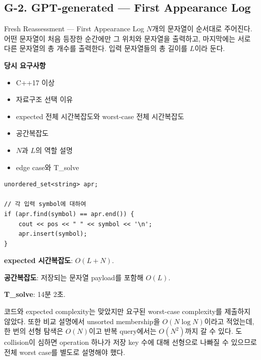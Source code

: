 \subsection{G-2. GPT-generated --- First Appearance Log}
\begin{problembox}{Fresh Reassessment --- First Appearance Log}
$N$개의 문자열이 순서대로 주어진다. 어떤 문자열이 처음 등장한 순간에만 그 위치와 문자열을 출력하고, 마지막에는 서로 다른 문자열의 총 개수를 출력한다. 입력 문자열들의 총 길이를 $L$이라 둔다.

\textbf{당시 요구사항}
\begin{itemize}
\item C++17 이상
\item 자료구조 선택 이유
\item expected 전체 시간복잡도와 worst-case 전체 시간복잡도
\item 공간복잡도
\item $N$과 $L$의 역할 설명
\item edge case와 T\_solve
\end{itemize}
\end{problembox}

\begin{answerbox}
\begin{lstlisting}
unordered_set<string> apr;

// 각 입력 symbol에 대하여
if (apr.find(symbol) == apr.end()) {
    cout << pos << " " << symbol << '\n';
    apr.insert(symbol);
}
\end{lstlisting}

\textbf{expected 시간복잡도}: $O(L+N)$.

\textbf{공간복잡도}: 저장되는 문자열 payload를 포함해 $O(L)$.

\textbf{T\_solve}: 14분 2초.
\end{answerbox}

\begin{notebox}
코드와 expected complexity는 맞았지만 요구된 worst-case complexity를 제출하지 않았다. 또한 비교 설명에서 unsorted  membership을 $O(N\log N)$이라고 적었는데, 한 번의 선형 탐색은 $O(N)$이고 반복 query에서는 $O(N^2)$까지 갈 수 있다. 도 collision이 심하면 operation 하나가 저장 key 수에 대해 선형으로 나빠질 수 있으므로 전체 worst case를 별도로 설명해야 했다.
\end{notebox}

